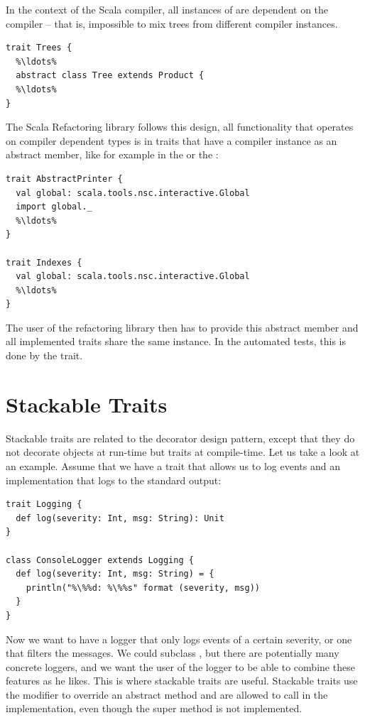 \documentclass[10pt,a4paper,oneside]{scrreprt}
\begin{document}
In the context of the Scala compiler, all instances of  are dependent on the compiler -- that is, impossible to mix trees from different compiler instances.

\begin{lstlisting}
trait Trees {
  %\ldots%
  abstract class Tree extends Product {
  %\ldots%
}
\end{lstlisting}

The Scala Refactoring library follows this design, all functionality that operates on compiler dependent types is in traits that have a compiler instance as an abstract member, like for example in the  or the :

\begin{lstlisting}
trait AbstractPrinter {
  val global: scala.tools.nsc.interactive.Global
  import global._
  %\ldots%
}

trait Indexes {
  val global: scala.tools.nsc.interactive.Global
  %\ldots%
}
\end{lstlisting}

The user of the refactoring library then has to provide this abstract member and all implemented traits share the same instance. In the automated tests, this is done by the  trait.

\section{Stackable Traits} \label{section:stackable-traits}

Stackable traits are related to the decorator design pattern, except that they do not decorate objects at run-time but traits at compile-time. Let us take a look at an example. Assume that we have a trait that allows us to log events and an implementation that logs to the standard output:

\begin{lstlisting}
trait Logging {
  def log(severity: Int, msg: String): Unit
}

class ConsoleLogger extends Logging {
  def log(severity: Int, msg: String) = {
    println("%\%%d: %\%%s" format (severity, msg))
  }
}
\end{lstlisting}

Now we want to have a logger that only logs events of a certain severity, or one that filters the messages. We could subclass , but there are potentially many concrete loggers, and we want the user of the logger to be able to combine these features as he likes. This is where stackable traits are useful. Stackable traits use the  modifier to override an abstract method and are allowed to call  in the implementation, even though the super method is not implemented.
\end{document}
